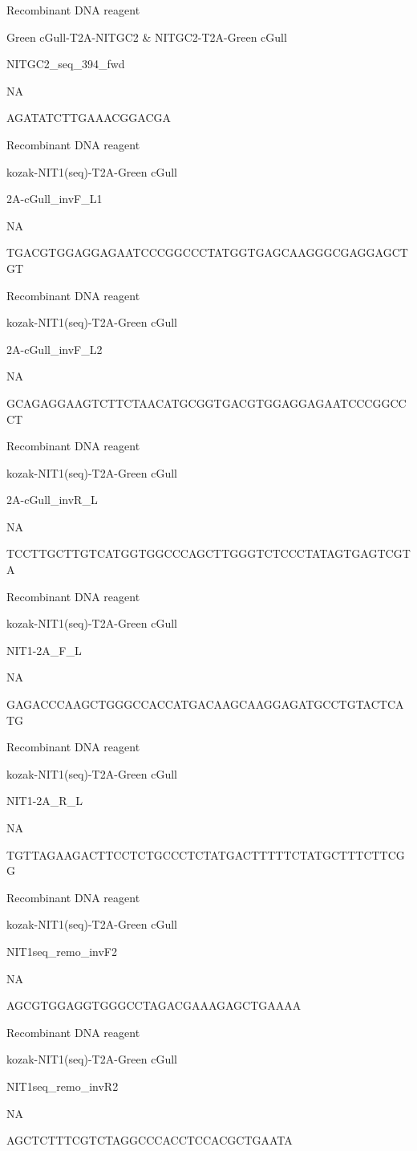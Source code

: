 \documentclass[
  10pt,
  onecolumn]{article}
\begin{document}
Recombinant DNA reagent

Green cGull-T2A-NITGC2 \& NITGC2-T2A-Green cGull

NITGC2\_seq\_394\_fwd

NA

AGATATCTTGAAACGGACGA

Recombinant DNA reagent

kozak-NIT1(seq)-T2A-Green cGull

2A-cGull\_invF\_L1

NA

TGACGTGGAGGAGAATCCCGGCCCTATGGTGAGCAAGGGCGAGGAGCTGT

Recombinant DNA reagent

kozak-NIT1(seq)-T2A-Green cGull

2A-cGull\_invF\_L2

NA

GCAGAGGAAGTCTTCTAACATGCGGTGACGTGGAGGAGAATCCCGGCCCT

Recombinant DNA reagent

kozak-NIT1(seq)-T2A-Green cGull

2A-cGull\_invR\_L

NA

TCCTTGCTTGTCATGGTGGCCCAGCTTGGGTCTCCCTATAGTGAGTCGTA

Recombinant DNA reagent

kozak-NIT1(seq)-T2A-Green cGull

NIT1-2A\_F\_L

NA

GAGACCCAAGCTGGGCCACCATGACAAGCAAGGAGATGCCTGTACTCATG

Recombinant DNA reagent

kozak-NIT1(seq)-T2A-Green cGull

NIT1-2A\_R\_L

NA

TGTTAGAAGACTTCCTCTGCCCTCTATGACTTTTTCTATGCTTTCTTCGG

Recombinant DNA reagent

kozak-NIT1(seq)-T2A-Green cGull

NIT1seq\_remo\_invF2

NA

AGCGTGGAGGTGGGCCTAGACGAAAGAGCTGAAAA

Recombinant DNA reagent

kozak-NIT1(seq)-T2A-Green cGull

NIT1seq\_remo\_invR2

NA

AGCTCTTTCGTCTAGGCCCACCTCCACGCTGAATA
\end{document}
